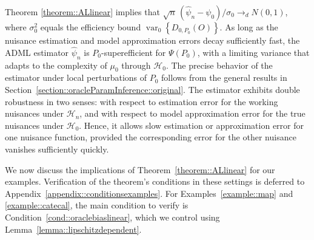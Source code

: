 \documentclass[11pt]{article}
\theoremstyle{definition}
\begin{document}
Theorem \ref{theorem::ALlinear} implies that $\sqrt{n}\,( \widehat{\psi}_n - \psi_0)/\sigma_0 \rightarrow_d N(0, 1)$, where $\sigma^2_0$ equals the efficiency bound $\operatorname{var}_{0}\left\{D_{0,P_0}(O)\right\}$. As long as the nuisance estimation and model approximation errors decay sufficiently fast, the ADML estimator $\widehat{\psi}_n$ is $P_0$-superefficient for \(\Psi(P_0)\), with a limiting variance that adapts to the complexity of \(\mu_0\) through \(\mathcal{H}_0\). The precise behavior of the estimator under local perturbations of $P_0$ follows from the general results in Section~\ref{section::oracleParamInference::original}. The estimator exhibits double robustness \citep{bang2005doubly} in two senses: with respect to estimation error for the working nuisances under \(\mathcal{H}_n\), and with respect to model approximation error for the true nuisances under \(\mathcal{H}_0\). Hence, it allows slow estimation or approximation error for one nuisance function, provided the corresponding error for the other nuisance vanishes sufficiently quickly.

We now discuss the implications of Theorem~\ref{theorem::ALlinear} for our examples. Verification of the theorem's conditions in these settings is deferred to Appendix~\ref{appendix::conditionsexamples}. For Examples~\ref{example::map} and \ref{example::catecal}, the main condition to verify is Condition~\ref{cond::oraclebiaslinear}, which we control using Lemma~\ref{lemma::lipschitzdependent}.


 

\setcounter{example}{1}
\end{document}
